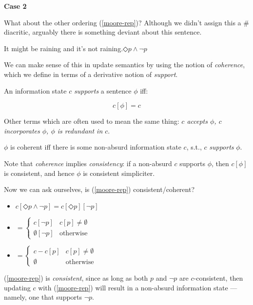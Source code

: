 \documentclass[nols,twoside,nofonts,nobib,nohyper]{tufte-handout}
\theoremstyle{definition}
\begin{document}
\textbf{Case 2}

What about the other ordering (\ref{moore-rep})? Although we didn't assign this a $\#$ diacritic, arguably there is something deviant about this sentence.

\ex
{}It might be raining and it's not raining.\hfill$◇ p ∧ ¬ p$\label{moore-rep}
\xe


We can make sense of this in update semantics by using the notion of \textit{coherence}, which we define in terms of a derivative notion of \textit{support}.

\begin{tcolorbox}[title=Support in update semantics]
  An information state $c$ \textit{supports} a sentence $ϕ$ iff:

  $$c[ϕ] = c$$

  Other terms which are often used to mean the same thing: \textit{$c$ accepts $\phi$, $c$ incorporates $\phi$, $ϕ$ is redundant in $c$}.
\end{tcolorbox}

\begin{tcolorbox}[title=Coherence in update semantics]
$ϕ$ is coherent iff there is some non-absurd information state $c$, s.t., $c$ \textit{supports} $ϕ$.
\end{tcolorbox}

Note that \textit{coherence} implies \textit{consistency}: if a non-absurd $c$ supports $ϕ$, then $c[ϕ]$ is consistent, and hence $ϕ$ is consistent simpliciter.

Now we can ask ourselves, is (\ref{moore-rep}) consistent/coherent?

\begin{itemize}
    \item $c[◇ p ∧ ¬ p] = c[◇ p][¬ p]$
  \item $= \begin{cases}
    c[¬ p]&c[p] ≠ ∅\\
    ∅[¬ p]&\text{otherwise}
   \end{cases}$
  \item $= \begin{cases}
    c - c[p]&c[p] ≠ ∅\\
    ∅&\text{otherwise}
    \end{cases}$
\end{itemize}

(\ref{moore-rep}) is \textit{consistent}, since as long as both $p$ and $¬ p$ are $c$-consistent, then updating $c$ with (\ref{moore-rep}) will result in a non-absurd information state --- namely, one that supports $¬ p$.
\end{document}

